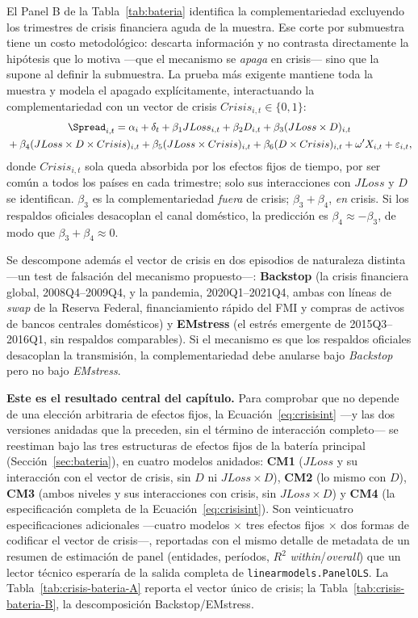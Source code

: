 El Panel B de la Tabla~\ref{tab:bateria} identifica la complementariedad excluyendo los trimestres de crisis financiera aguda de la muestra. Ese corte por submuestra tiene un costo metodológico: descarta información y no contrasta directamente la hipótesis que lo motiva —que el mecanismo se \emph{apaga} en crisis— sino que la supone al definir la submuestra. La prueba más exigente mantiene toda la muestra y modela el apagado explícitamente, interactuando la complementariedad con un vector de crisis $Crisis_{i,t}\in\{0,1\}$:
\begin{multline}
\Spread_{i,t} = \alpha_i + \delta_t + \beta_1 JLoss_{i,t} + \beta_2 D_{i,t} + \beta_3(JLoss\times D)_{i,t}\\
{}+ \beta_4(JLoss\times D\times Crisis)_{i,t} + \beta_5(JLoss\times Crisis)_{i,t} + \beta_6(D\times Crisis)_{i,t} + \omega'X_{i,t} + \varepsilon_{i,t},
\label{eq:crisisint}
\end{multline}
donde $Crisis_{i,t}$ sola queda absorbida por los efectos fijos de tiempo, por ser común a todos los países en cada trimestre; solo sus interacciones con $JLoss$ y $D$ se identifican. $\beta_3$ es la complementariedad \emph{fuera} de crisis; $\beta_3+\beta_4$, \emph{en} crisis. Si los respaldos oficiales desacoplan el canal doméstico, la predicción es $\beta_4\approx-\beta_3$, de modo que $\beta_3+\beta_4\approx0$.

Se descompone además el vector de crisis en dos episodios de naturaleza distinta —un test de falsación del mecanismo propuesto—: \textbf{Backstop} (la crisis financiera global, 2008Q4--2009Q4, y la pandemia, 2020Q1--2021Q4, ambas con líneas de \textit{swap} de la Reserva Federal, financiamiento rápido del FMI y compras de activos de bancos centrales domésticos) y \textbf{EMstress} (el estrés emergente de 2015Q3--2016Q1, sin respaldos comparables). Si el mecanismo es que los respaldos oficiales desacoplan la transmisión, la complementariedad debe anularse bajo \textit{Backstop} pero no bajo \textit{EMstress}.

\textbf{Este es el resultado central del capítulo.} Para comprobar que no depende de una elección arbitraria de efectos fijos, la Ecuación~\eqref{eq:crisisint} —y las dos versiones anidadas que la preceden, sin el término de interacción completo— se reestiman bajo las tres estructuras de efectos fijos de la batería principal (Sección~\ref{sec:bateria}), en cuatro modelos anidados: \textbf{CM1} ($JLoss$ y su interacción con el vector de crisis, sin $D$ ni $JLoss\times D$), \textbf{CM2} (lo mismo con $D$), \textbf{CM3} (ambos niveles y sus interacciones con crisis, sin $JLoss\times D$) y \textbf{CM4} (la especificación completa de la Ecuación~\eqref{eq:crisisint}). Son veinticuatro especificaciones adicionales —cuatro modelos $\times$ tres efectos fijos $\times$ dos formas de codificar el vector de crisis—, reportadas con el mismo detalle de metadata de un resumen de estimación de panel (entidades, períodos, $R^2$ \textit{within}/\textit{overall}) que un lector técnico esperaría de la salida completa de \texttt{linearmodels.PanelOLS}. La Tabla~\ref{tab:crisis-bateria-A} reporta el vector único de crisis; la Tabla~\ref{tab:crisis-bateria-B}, la descomposición Backstop/EMstress.

